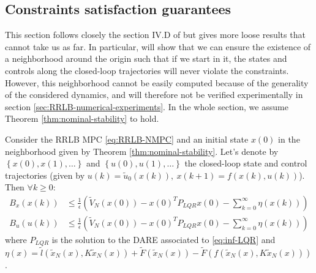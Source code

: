 \documentclass[12pt]{article}
\begin{document}
\subsection{Constraints satisfaction guarantees}\label{sec:constraints-satisfaction-guarantees}
This section follows closely the section IV.D of \cite{RRLB-linear-MPC} but gives more loose results that cannot take us as far.
In particular, will show that we can ensure the existence of a neighborhood around the origin such that if we start in it, the states and controls along the closed-loop trajectories will never violate the constraints.
However, this neighborhood cannot be easily computed because of the generality of the considered dynamics, and will therefore not be verified experimentally in section \ref{sec:RRLB-numerical-experiments}.
In the whole section, we assume Theorem \ref{thm:nominal-stability} to hold.

\begin{lemma}
	\label{thm:RRLB-bounds-guarantees}
	Consider the RRLB MPC \ref{eq:RRLB-NMPC} and an initial state $x(0)$ in the neighborhood given by Theorem \ref{thm:nominal-stability}.
	Let's denote by $\left\{x(0),x(1),\dots\right\}$ and $\left\{u(0), u(1),\dots\right\}$ the closed-loop state and control trajectories (given by $u(k)=\tilde{u}_0(x(k)),~x(k+1)=f(x(k),u(k))$).
	Then $\forall k\geq 0$:
	\begin{align*}
		B_x(x(k))&\leq\frac{1}{\epsilon}\left(\tilde{V}_N(x(0))-x(0)^TP_{LQR}x(0)-\sum_{k=0}^\infty\eta(x(k))\right)\\
		B_u(u(k))&\leq\frac{1}{\epsilon}\left(\tilde{V}_N(x(0))-x(0)^TP_{LQR}x(0)-\sum_{k=0}^\infty\eta(x(k))\right)
	\end{align*}
	where $P_{LQR}$ is the solution to the DARE associated to \ref{eq:inf-LQR} and $\eta(x)=\tilde{l}(\tilde{x}_N(x),K\tilde{x}_N(x))+\tilde{F}(\tilde{x}_N(x))-\tilde{F}(f(\tilde{x}_N(x), K\tilde{x}_N(x)))$.
\end{lemma}
\end{document}
